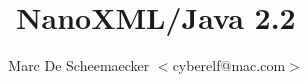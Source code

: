 \documentclass[a4paper]{book}
\title{NanoXML/Java 2.2}
\author{Marc De Scheemaecker $<$cyberelf@mac.com$>$}
\begin{document}
\titlepage
\maketitle

\tableofcontents








\end{document}
